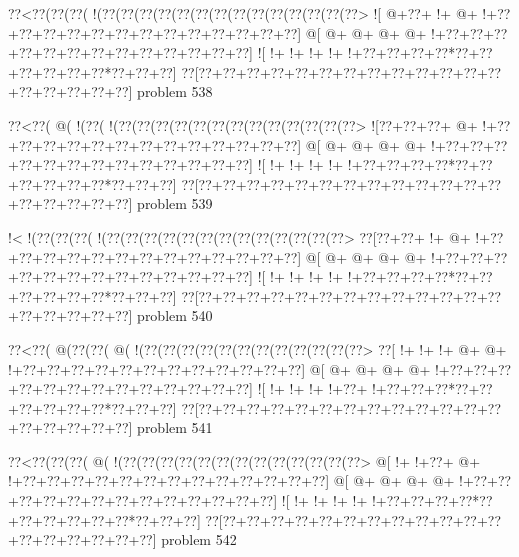 \vbox{\vbox{\goo
\0??<\0??(\0??(\0??(\- !(\0??(\0??(\0??(\0??(\0??(\0??(\0??(\0??(\0??(\0??(\0??(\0??(\0??(\0??>
\- ![\- @+\0??+\- !+\- @+\- !+\0??+\0??+\0??+\0??+\0??+\0??+\0??+\0??+\0??+\0??+\0??+\0??+\0??]
\- @[\- @+\- @+\- @+\- @+\- !+\0??+\0??+\0??+\0??+\0??+\0??+\0??+\0??+\0??+\0??+\0??+\0??+\0??]
\- ![\- !+\- !+\- !+\- !+\- !+\0??+\0??+\0??+\0??*\0??+\0??+\0??+\0??+\0??+\0??*\0??+\0??+\0??]
\0??[\0??+\0??+\0??+\0??+\0??+\0??+\0??+\0??+\0??+\0??+\0??+\0??+\0??+\0??+\0??+\0??+\0??+\0??]
}
\hfil problem 538\hfil\break
}



\vbox{\vbox{\goo
\0??<\0??(\- @(\- !(\0??(\- !(\0??(\0??(\0??(\0??(\0??(\0??(\0??(\0??(\0??(\0??(\0??(\0??(\0??>
\- ![\0??+\0??+\0??+\- @+\- !+\0??+\0??+\0??+\0??+\0??+\0??+\0??+\0??+\0??+\0??+\0??+\0??+\0??]
\- @[\- @+\- @+\- @+\- @+\- !+\0??+\0??+\0??+\0??+\0??+\0??+\0??+\0??+\0??+\0??+\0??+\0??+\0??]
\- ![\- !+\- !+\- !+\- !+\- !+\0??+\0??+\0??+\0??*\0??+\0??+\0??+\0??+\0??+\0??*\0??+\0??+\0??]
\0??[\0??+\0??+\0??+\0??+\0??+\0??+\0??+\0??+\0??+\0??+\0??+\0??+\0??+\0??+\0??+\0??+\0??+\0??]
}
\hfil problem 539\hfil\break
}



\vbox{\vbox{\goo
\- !<\- !(\0??(\0??(\0??(\- !(\0??(\0??(\0??(\0??(\0??(\0??(\0??(\0??(\0??(\0??(\0??(\0??(\0??>
\0??[\0??+\0??+\- !+\- @+\- !+\0??+\0??+\0??+\0??+\0??+\0??+\0??+\0??+\0??+\0??+\0??+\0??+\0??]
\- @[\- @+\- @+\- @+\- @+\- !+\0??+\0??+\0??+\0??+\0??+\0??+\0??+\0??+\0??+\0??+\0??+\0??+\0??]
\- ![\- !+\- !+\- !+\- !+\- !+\0??+\0??+\0??+\0??*\0??+\0??+\0??+\0??+\0??+\0??*\0??+\0??+\0??]
\0??[\0??+\0??+\0??+\0??+\0??+\0??+\0??+\0??+\0??+\0??+\0??+\0??+\0??+\0??+\0??+\0??+\0??+\0??]
}
\hfil problem 540\hfil\break
}



\vbox{\vbox{\goo
\0??<\0??(\- @(\0??(\0??(\- @(\- !(\0??(\0??(\0??(\0??(\0??(\0??(\0??(\0??(\0??(\0??(\0??(\0??>
\0??[\- !+\- !+\- !+\- @+\- @+\- !+\0??+\0??+\0??+\0??+\0??+\0??+\0??+\0??+\0??+\0??+\0??+\0??]
\- @[\- @+\- @+\- @+\- @+\- !+\0??+\0??+\0??+\0??+\0??+\0??+\0??+\0??+\0??+\0??+\0??+\0??+\0??]
\- ![\- !+\- !+\- !+\- !+\0??+\- !+\0??+\0??+\0??*\0??+\0??+\0??+\0??+\0??+\0??*\0??+\0??+\0??]
\0??[\0??+\0??+\0??+\0??+\0??+\0??+\0??+\0??+\0??+\0??+\0??+\0??+\0??+\0??+\0??+\0??+\0??+\0??]
}
\hfil problem 541\hfil\break
}



\vbox{\vbox{\goo
\0??<\0??(\0??(\0??(\- @(\- !(\0??(\0??(\0??(\0??(\0??(\0??(\0??(\0??(\0??(\0??(\0??(\0??(\0??>
\- @[\- !+\- !+\0??+\- @+\- !+\0??+\0??+\0??+\0??+\0??+\0??+\0??+\0??+\0??+\0??+\0??+\0??+\0??]
\- @[\- @+\- @+\- @+\- @+\- !+\0??+\0??+\0??+\0??+\0??+\0??+\0??+\0??+\0??+\0??+\0??+\0??+\0??]
\- ![\- !+\- !+\- !+\- !+\- !+\0??+\0??+\0??+\0??*\0??+\0??+\0??+\0??+\0??+\0??*\0??+\0??+\0??]
\0??[\0??+\0??+\0??+\0??+\0??+\0??+\0??+\0??+\0??+\0??+\0??+\0??+\0??+\0??+\0??+\0??+\0??+\0??]
}
\hfil problem 542\hfil\break
}



